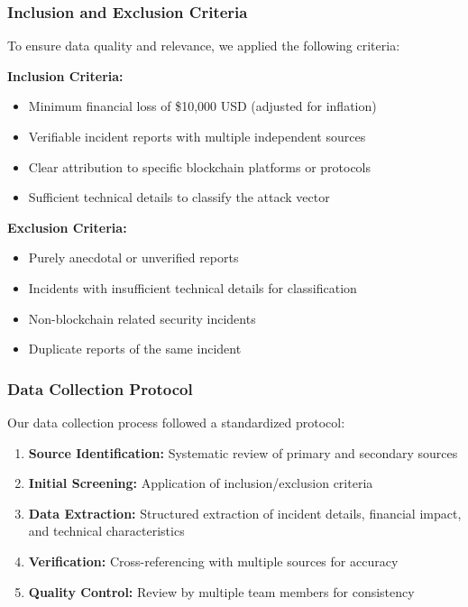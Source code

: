 \subsubsection{Inclusion and Exclusion Criteria}
To ensure data quality and relevance, we applied the following criteria:

\textbf{Inclusion Criteria:}
\begin{itemize}
    \item Minimum financial loss of \$10,000 USD (adjusted for inflation)
    \item Verifiable incident reports with multiple independent sources
    \item Clear attribution to specific blockchain platforms or protocols
    \item Sufficient technical details to classify the attack vector
\end{itemize}

\textbf{Exclusion Criteria:}
\begin{itemize}
    \item Purely anecdotal or unverified reports
    \item Incidents with insufficient technical details for classification
    \item Non-blockchain related security incidents
    \item Duplicate reports of the same incident
\end{itemize}


\subsubsection{Data Collection Protocol}
Our data collection process followed a standardized protocol:
\begin{enumerate}
    \item \textbf{Source Identification:} Systematic review of primary and secondary sources
    \item \textbf{Initial Screening:} Application of inclusion/exclusion criteria
    \item \textbf{Data Extraction:} Structured extraction of incident details, financial impact, and technical characteristics
    \item \textbf{Verification:} Cross-referencing with multiple sources for accuracy
    \item \textbf{Quality Control:} Review by multiple team members for consistency
\end{enumerate}

